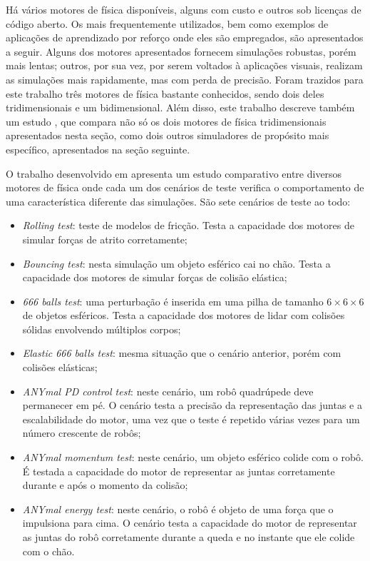 \documentclass[cic,tc]{iiufrgs}
\begin{document}
Há vários motores de física disponíveis, alguns com custo e outros sob licenças
de código aberto. Os mais frequentemente utilizados, bem como exemplos de
aplicações de aprendizado por reforço onde eles são empregados, são apresentados
a seguir. Alguns dos motores apresentados fornecem simulações
robustas, porém mais lentas; outros, por sua vez, por serem voltados à
aplicações visuais, realizam as simulações mais rapidamente, mas com perda de
precisão. Foram trazidos para este trabalho três motores de física bastante
conhecidos, sendo dois deles tridimensionais e um bidimensional. Além disso,
este trabalho descreve também um estudo \cite{LeggedRobotics2018}, que compara não
só os dois motores de física tridimensionais apresentados nesta seção, como dois
outros simuladores de propósito mais específico, apresentados na seção seguinte.


O trabalho desenvolvido em \cite{LeggedRobotics2018} apresenta um estudo
comparativo entre diversos motores de física onde cada um dos cenários de teste
verifica o comportamento de uma característica diferente das  simulações. São
sete cenários de teste ao todo:


\begin{itemize}
  \item \textit{Rolling test}: teste de modelos de fricção. Testa a capacidade
  dos motores de simular forças de atrito corretamente;
  \item \textit{Bouncing test}: nesta simulação um objeto esférico cai no chão.
  Testa a capacidade dos motores de simular forças de colisão elástica;
  \item \textit{666 balls test}: uma perturbação é inserida em uma pilha de
  tamanho $6 \times 6 \times 6$ de objetos esféricos. Testa a capacidade dos
  motores de lidar com colisões sólidas envolvendo múltiplos corpos;
  \item \textit{Elastic 666 balls test}: mesma situação que o cenário anterior,
  porém com colisões elásticas;
  \item \textit{ANYmal PD control test}: neste cenário, um robô quadrúpede
  \cite{ANYmal} deve permanecer em pé. O cenário testa a precisão da
  representação das juntas e a escalabilidade do motor, uma vez que o teste é
  repetido várias vezes para um número crescente de robôs;
  \item \textit{ANYmal momentum test}: neste cenário, um objeto esférico colide
  com o robô. É testada a capacidade do motor de representar as juntas
  corretamente durante e após o momento da colisão;
  \item \textit{ANYmal energy test}: neste cenário, o robô é objeto de uma força
  que o impulsiona para cima. O cenário testa a capacidade do motor de
  representar as juntas do robô corretamente durante a queda e no instante que
  ele colide com o chão.

\end{itemize}
\end{document}
